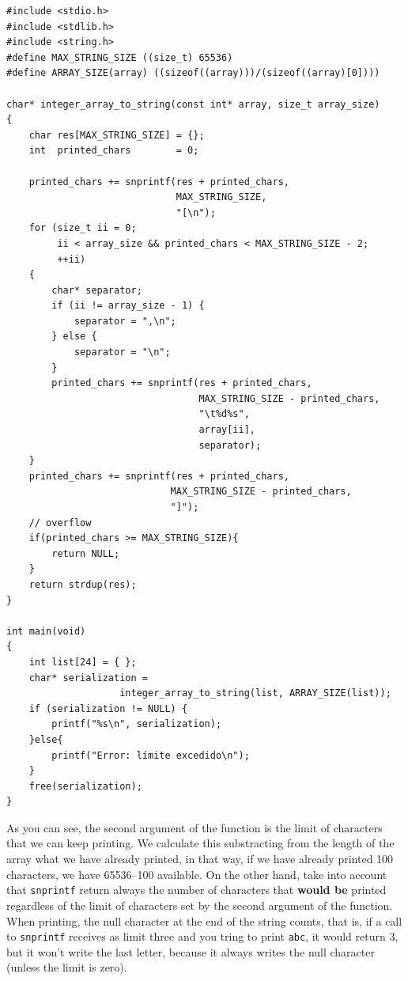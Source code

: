 \documentclass[a4paper]{article}
\begin{document}
\noindent
\begin{minipage}[H]{\linewidth}
\mbox{}
\begin{lstlisting}[style=C,
caption={Ejemplo de uso de \texttt{snprintf}},
label={lst:snprintfExample}]
#include <stdio.h>
#include <stdlib.h>
#include <string.h>
#define MAX_STRING_SIZE ((size_t) 65536)
#define ARRAY_SIZE(array) ((sizeof((array)))/(sizeof((array)[0])))

char* integer_array_to_string(const int* array, size_t array_size)
{
    char res[MAX_STRING_SIZE] = {};
    int  printed_chars        = 0;

    printed_chars += snprintf(res + printed_chars,
                              MAX_STRING_SIZE,
                              "[\n");
    for (size_t ii = 0;
         ii < array_size && printed_chars < MAX_STRING_SIZE - 2;
         ++ii)
    {
        char* separator;
        if (ii != array_size - 1) {
            separator = ",\n";
        } else {
            separator = "\n";
        }
        printed_chars += snprintf(res + printed_chars,
                                  MAX_STRING_SIZE - printed_chars,
                                  "\t%d%s",
                                  array[ii],
                                  separator);
    }
    printed_chars += snprintf(res + printed_chars,
                             MAX_STRING_SIZE - printed_chars,
                             "]");
    // overflow
    if(printed_chars >= MAX_STRING_SIZE){
        return NULL;
    }
    return strdup(res);
}

int main(void)
{
    int list[24] = { };
    char* serialization =
                    integer_array_to_string(list, ARRAY_SIZE(list));
    if (serialization != NULL) {
        printf("%s\n", serialization);
    }else{
        printf("Error: límite excedido\n");
    }
    free(serialization);
}
\end{lstlisting}
\end{minipage}

As you can see, the second argument of the function is the limit of characters
that we can keep printing. We calculate this substracting from the length of the
array what we have already printed, in that way, if we have already printed
100 characters, we have 65536--100 available. On the other hand, take into
account that \verb!snprintf! return always the number of characters that
\textbf{would be} printed regardless of the limit of characters set by the
second argument of the function. When printing, the null character at the end
of the string counts, that is, if a call to \verb!snprintf! receives as limit
three and you tring to print \verb!abc!, it would return 3, but it won't write
the last letter, because it always writes the null character (unless the limit
is zero).
\end{document}
